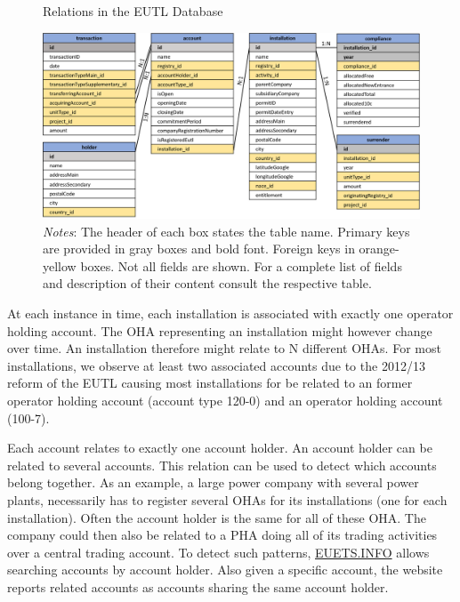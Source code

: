 \documentclass[authoryear]{elsarticle}
\begin{document}
\begin{figure}[!htbp]
	\caption{Relations in the EUTL Database}\label{fig:eutl_database}
	\centering
	\includegraphics[width=\textwidth]{figures/eutl_database.png}
	\vspace{-5ex}
	\caption*{\footnotesize \emph{Notes}: The header of each box states the table name. Primary keys are provided in gray boxes and bold font. Foreign keys in orange-yellow boxes. Not all fields are shown. For a complete list of fields and description of their content consult the respective table.}
	\vspace{0ex}
\end{figure}

At each instance in time, each installation is associated with exactly one operator holding account. The OHA representing an installation might however change over time. An installation therefore might relate to N different OHAs. For most installations, we observe at least two associated accounts due to the 2012/13 reform of the EUTL causing most installations for be related to an former operator holding account (account type 120-0) and an operator holding account (100-7).

Each account relates to exactly one account holder. An account holder can be related to several accounts. This relation can be used to detect which accounts belong together. As an example, a large power company with several power plants, necessarily has to register several OHAs for its installations (one for each installation). Often the account holder is the same for all of these OHA. The company could then also be related to a PHA doing all of its trading activities over a central trading account. To detect such patterns, \href{https://www.euets.info}{EUETS.INFO} allows searching accounts by account holder. Also given a specific account, the website reports related accounts as accounts sharing the same account holder. 
\end{document}
